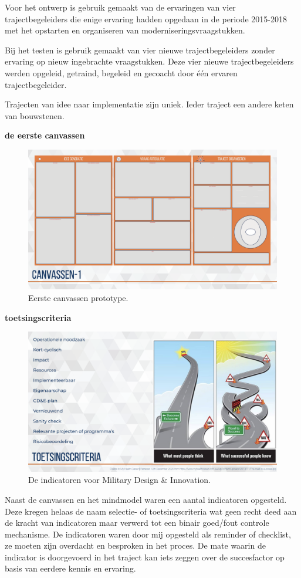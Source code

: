 \documentclass[
]{book}
\begin{document}
Voor het ontwerp is gebruik gemaakt van de ervaringen van vier trajectbegeleiders die enige ervaring hadden opgedaan in de periode 2015-2018 met het opstarten en organiseren van moderniseringsvraagstukken.

Bij het testen is gebruik gemaakt van vier nieuwe trajectbegeleiders zonder ervaring op nieuw ingebrachte vraagstukken. Deze vier nieuwe trajectbegeleiders werden opgeleid, getraind, begeleid en gecoacht door één ervaren trajectbegeleider.

Trajecten van idee naar implementatie zijn uniek.
Ieder traject een andere keten van bouwstenen.

\textbf{de eerste canvassen}

\begin{figure}

{\centering \includegraphics[width=0.5\linewidth]{data/keynote-slides/20200430-CDE-Designprocess/20200430-CDE-Designprocess.023} 

}

\caption{Eerste canvassen prototype.}\label{fig:unnamed-chunk-18}
\end{figure}

\textbf{toetsingscriteria}

\begin{figure}

{\centering \includegraphics[width=0.5\linewidth]{data/keynote-slides/20200430-CDE-Designprocess/20200430-CDE-Designprocess.024} 

}

\caption{De indicatoren voor Military Design \& Innovation.}\label{fig:unnamed-chunk-19}
\end{figure}

Naast de canvassen en het mindmodel waren een aantal indicatoren opgesteld. Deze kregen helaas de naam selectie- of toetsingscriteria wat geen recht deed aan de kracht van indicatoren maar verwerd tot een binair goed/fout controle mechanisme. De indicatoren waren door mij opgesteld als reminder of checklist, ze moeten zijn overdacht en besproken in het proces. De mate waarin de indicator is doorgevoerd in het traject kan iets zeggen over de succesfactor op basis van eerdere kennis en ervaring.
\end{document}
